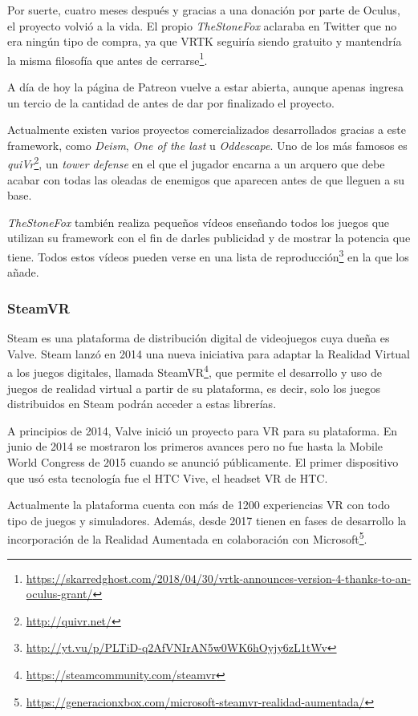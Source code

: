 Por suerte, cuatro meses después y gracias a una donación por parte de Oculus, el proyecto volvió a la vida. El propio \textit{TheStoneFox} aclaraba en Twitter que no era ningún tipo de compra, ya que \acs{VRTK} seguiría siendo gratuito y mantendría la misma filosofía que antes de cerrarse\footnote{\url{https://skarredghost.com/2018/04/30/vrtk-announces-version-4-thanks-to-an-oculus-grant/}}.

A día de hoy la página de Patreon vuelve a estar abierta, aunque apenas ingresa un tercio de la cantidad de antes de dar por finalizado el proyecto.

Actualmente existen varios proyectos comercializados desarrollados gracias a este framework, como \textit{Deism}, \textit{One of the last} u \textit{Oddescape}. Uno de los más famosos es \textit{quiVr}\footnote{\url{http://quivr.net/}}, un \textit{tower defense} en el que el jugador encarna a un arquero que debe acabar con todas las oleadas de enemigos que aparecen antes de que lleguen a su base.

\textit{TheStoneFox} también realiza pequeños vídeos enseñando todos los juegos que utilizan su framework con el fin de darles publicidad y de mostrar la potencia que tiene. Todos estos vídeos pueden verse en una lista de reproducción\footnote{\url{http://yt.vu/p/PLTiD-q2AfVNIrAN5w0WK6hOyjy6zL1tWv}} en la que los añade. 

\subsubsection{SteamVR}

Steam es una plataforma de distribución digital de videojuegos cuya dueña es Valve. Steam lanzó en 2014 una nueva iniciativa para adaptar la Realidad Virtual a los juegos digitales, llamada SteamVR\footnote{\url{https://steamcommunity.com/steamvr}}, que permite el desarrollo y uso de juegos de realidad virtual a partir de su plataforma, es decir, solo los juegos distribuidos en Steam podrán acceder a estas librerías.

A principios de  2014, Valve inició un proyecto para \acs{VR} para su plataforma. En junio de 2014 se mostraron los primeros avances pero no fue hasta la Mobile World Congress de 2015 cuando se anunció públicamente. El primer dispositivo que usó esta tecnología fue el HTC Vive, el headset \acs{VR} de HTC.

Actualmente la plataforma cuenta con más de 1200 experiencias \acs{VR} con todo tipo de juegos y simuladores. Además, desde 2017 tienen en fases de desarrollo la incorporación de la Realidad Aumentada en colaboración con Microsoft\footnote{\url{https://generacionxbox.com/microsoft-steamvr-realidad-aumentada/}}.

